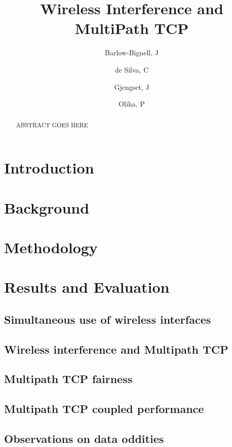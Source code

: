 \documentclass[12pt,a4paper]{article}
\title{Wireless Interference and MultiPath TCP}
\author{Barlow-Bignell, J}
\author{de Silva, C}
\author{Gjengset, J}
\author{Oliha, P}
\affil{University College London}
\date{}
\begin{document}
\maketitle

\begin{abstract}
  ABSTRACT GOES HERE
\end{abstract}
\clearpage

\section{Introduction}


\section{Background}


\section{Methodology}


\section{Results and Evaluation}

\subsection{Simultaneous use of wireless interfaces}
\label{sec:results-wifi}

\subsection{Wireless interference and Multipath TCP}
\label{sec:results-mptcp}

\subsection{Multipath TCP fairness}
\label{sec:results-fairness}

\subsection{Multipath TCP coupled performance}
\label{sec:results-performance}

\subsection{Observations on data oddities}
\label{sec:results-oddities}

\end{document}
